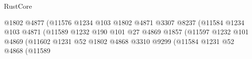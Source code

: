 \begin{lexlean}{RustCore}
\begin{coremodule}
                                                              @1802
                                                              @4877
                                                              (@11576
                                                                @1234
                                                                @103
                                                                @1802
                                                                @4871
                                                                @3307
                                                                @8237
                                                                (@11584
                                                                  @1234
                                                                  @103
                                                                  @4871
                                                                  (@11589
                                                                    @1232
                                                                    @190
                                                                    @101
                                                                    @27
                                                                    @4869
                                                                    @1857
                                                                    (@11597
                                                                      @1232
                                                                      @101
                                                                      @4869
                                                                      (@11602
                                                                        @1231
                                                                        @52
                                                                        @1802
                                                                        @4868
                                                                        @3310
                                                                        @9299
                                                                        (@11584
                                                                          @1231
                                                                          @52
                                                                          @4868
                                                                          (@11589

\end{coremodule}
\end{lexlean}
